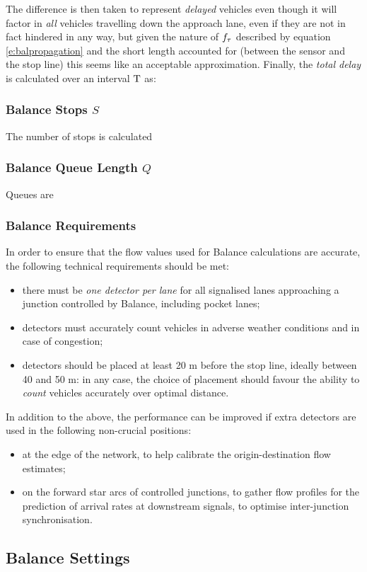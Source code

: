 The difference is then taken to represent \emph{delayed} vehicles even though it will factor in \emph{all} vehicles travelling down the approach lane, even if they are not in fact hindered in any way, but given the nature of $f_{\tau}$ described by equation \eqref{e:balpropagation} and the short length accounted for (between the sensor and the stop line) this seems like an acceptable approximation. Finally, the \emph{total delay} is calculated over an interval $\mathrm{T}$ as:

\subsubsection*{Balance Stops $S$}
The number of stops is calculated

\subsubsection*{Balance Queue Length $Q$}
Queues are

\subsubsection{Balance Requirements} \label{s:balreq}
In order to ensure that the flow values used for Balance calculations are accurate, the following technical requirements should be met:
\begin{itemize}
\item there must be \emph{one detector per lane} for all signalised lanes approaching a junction controlled by Balance, including pocket lanes;
\item detectors must accurately count vehicles in adverse weather conditions and in case of congestion;
\item detectors should be placed at least 20 m before the stop line, ideally between 40 and 50 m: in any case, the choice of placement should favour the ability to \emph{count} vehicles accurately over optimal distance.
\end{itemize}

In addition to the above, the performance can be improved if extra detectors are used in the following non-crucial positions:
\begin{itemize}
\item at the edge of the network, to help calibrate the origin-destination flow estimates;
\item on the forward star arcs of controlled junctions, to gather flow profiles for the prediction of arrival rates at downstream signals, to optimise inter-junction synchronisation.
\end{itemize}

\subsection{Balance Settings} \label{s:balset}



